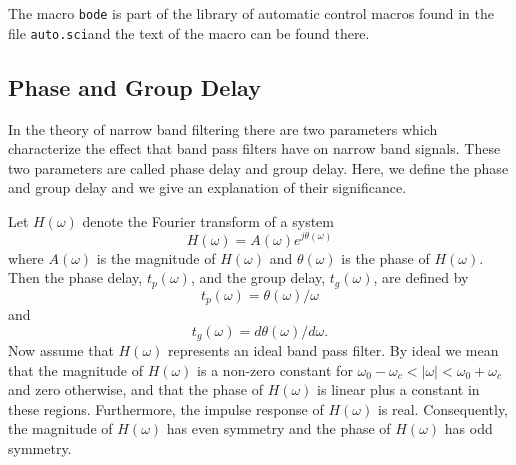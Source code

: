 	The macro {\tt bode} is part of the library of automatic
control macros found in the file {\tt auto.sci}and the text of the 
macro can be found there.

\subsection{Phase and Group Delay}
\label{group}

	In the theory of narrow band filtering
there are two parameters which characterize the 
effect that band pass filters have on narrow band
signals.  These two parameters are called phase delay
and group delay.  Here, we define the phase and
group delay and we give an explanation of their
significance.

	Let $H(\omega)$ denote the Fourier transform of
a system
%
\begin{equation}
H(\omega)=A(\omega)e^{j\theta(\omega)}
\label{e0.1.1}
\end{equation}
%
where $A(\omega)$ is the magnitude of $H(\omega)$ and
$\theta(\omega)$ is the phase of $H(\omega)$.  Then the phase delay, 
$t_p(\omega)$, and the group delay, $t_g(\omega)$, are defined by
%
\begin{equation}
t_p(\omega)=\theta(\omega)/\omega
\label{e0.1.2}
\end{equation}
%
and
%
\begin{equation}
t_g(\omega)=d\theta(\omega)/d\omega.
\label{e0.1.3}
\end{equation}
%
Now assume that $H(\omega)$ represents an ideal
band pass filter.  By ideal we mean that
the magnitude of $H(\omega)$ is a non-zero constant for
$\omega_0-\omega_c<|\omega|<\omega_0+\omega_c$
and zero otherwise, and that the phase of 
$H(\omega)$ is linear plus a constant in these regions.
Furthermore, the impulse response of $H(\omega)$
is real.  Consequently, the magnitude of $H(\omega)$
has even symmetry and the phase of $H(\omega)$ has odd
symmetry.  



